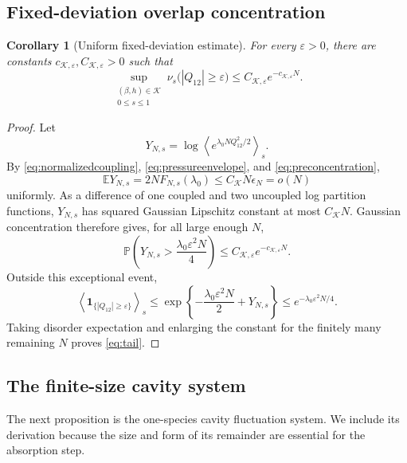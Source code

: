 \documentclass[11pt]{article}
\numberwithin{equation}{section}
\theoremstyle{plain}
\newtheorem{corollary}[theorem]{Corollary}
\theoremstyle{definition}
\newcommand{\E}{\mathbb E}
\newcommand{\1}{\mathbf 1}
\newcommand{\cK}{\mathcal K}
\begin{document}
\subsection{Fixed-deviation overlap concentration}\label{subsec:tails}

\begin{corollary}[Uniform fixed-deviation estimate]
\label{cor:tail}
For every $\varepsilon>0$, there are constants
$c_{\cK,\varepsilon},C_{\cK,\varepsilon}>0$ such that
\begin{equation}
 \sup_{\substack{(\beta,h)\in\cK\\0\le s\le1}}
 \nu_s\bigl(|Q_{12}|\ge\varepsilon\bigr)
 \le C_{\cK,\varepsilon}e^{-c_{\cK,\varepsilon}N}.
 \label{eq:tail}
\end{equation}
\end{corollary}

\begin{proof}
Let
\[
 Y_{N,s}
 =\log\left\langle
 e^{\lambda_0NQ_{12}^2/2}\right\rangle_s.
\]
By \eqref{eq:normalizedcoupling},
\eqref{eq:pressureenvelope}, and
\eqref{eq:preconcentration},
\[
 \E Y_{N,s}=2NF_{N,s}(\lambda_0)
 \le C_{\cK}N\epsilon_N=o(N)
\]
uniformly.  As a difference of one coupled and two uncoupled log
partition functions, $Y_{N,s}$ has squared Gaussian Lipschitz constant
at most $C_{\cK}N$.  Gaussian concentration therefore gives, for all
large enough $N$,
\[
 \mathbb P\left(
 Y_{N,s}>\frac{\lambda_0\varepsilon^2N}{4}\right)
 \le C_{\cK,\varepsilon}e^{-c_{\cK,\varepsilon}N}.
\]
Outside this exceptional event,
\[
 \left\langle\1_{\{|Q_{12}|\ge\varepsilon\}}\right\rangle_s
 \le
 \exp\left\{-\frac{\lambda_0\varepsilon^2N}{2}
 +Y_{N,s}\right\}
 \le e^{-\lambda_0\varepsilon^2N/4}.
\]
Taking disorder expectation and enlarging the constant for the
finitely many remaining $N$ proves \eqref{eq:tail}.
\end{proof}

\subsection{The finite-size cavity system}\label{subsec:cavity}

The next proposition is the one-species cavity fluctuation system.  We
include its derivation because the size and form of its remainder are
essential for the absorption step.
\end{document}
